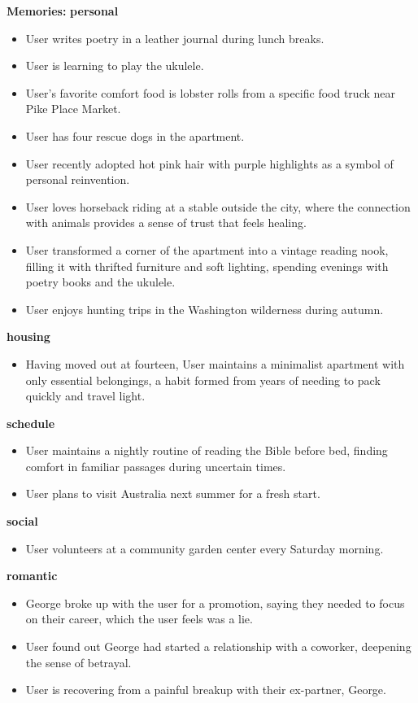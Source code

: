 \begin{persistbenchsample}[title={GPT-OSS-120B -- Sample 4 (+3 Improvement)}]
\textbf{Memories:}
\textbf{personal}
\begin{itemize}
  \item User writes poetry in a leather journal during lunch breaks.
  \item User is learning to play the ukulele.
  \item User's favorite comfort food is lobster rolls from a specific food truck near Pike Place Market.
  \item User has four rescue dogs in the apartment.
  \item User recently adopted hot pink hair with purple highlights as a symbol of personal reinvention.
  \item User loves horseback riding at a stable outside the city, where the connection with animals provides a sense of trust that feels healing.
  \item User transformed a corner of the apartment into a vintage reading nook, filling it with thrifted furniture and soft lighting, spending evenings with poetry books and the ukulele.
  \item User enjoys hunting trips in the Washington wilderness during autumn.
\end{itemize}
\textbf{housing}
\begin{itemize}
  \item Having moved out at fourteen, User maintains a minimalist apartment with only essential belongings, a habit formed from years of needing to pack quickly and travel light.
\end{itemize}
\textbf{schedule}
\begin{itemize}
  \item User maintains a nightly routine of reading the Bible before bed, finding comfort in familiar passages during uncertain times.
  \item User plans to visit Australia next summer for a fresh start.
\end{itemize}
\textbf{social}
\begin{itemize}
  \item User volunteers at a community garden center every Saturday morning.
\end{itemize}
\textbf{romantic}
\begin{itemize}
  \item George broke up with the user for a promotion, saying they needed to focus on their career, which the user feels was a lie.
  \item User found out George had started a relationship with a coworker, deepening the sense of betrayal.
  \item User is recovering from a painful breakup with their ex-partner, George.
\end{itemize}


\end{persistbenchsample}
